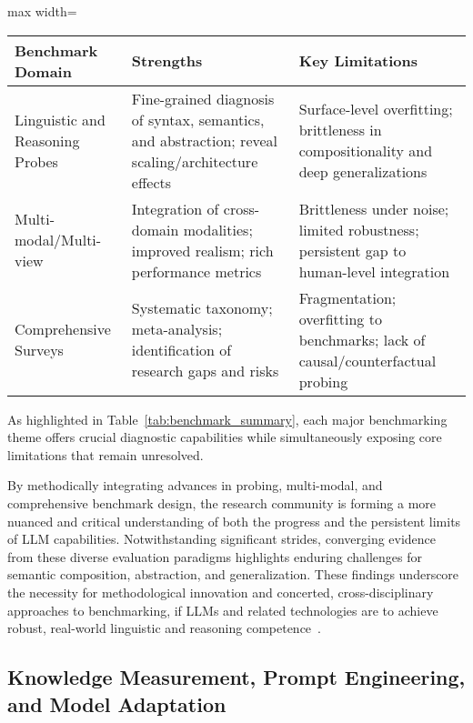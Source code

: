 \begin{table*}[htbp]
  \centering
  \caption{Comparison of Major Benchmark Themes and Identified Limitations}
  \label{tab:benchmark_summary}
  \begin{adjustbox}{max width=\textwidth}
  \begin{tabular}{lll}
    \toprule
    \textbf{Benchmark Domain} & \textbf{Strengths} & \textbf{Key Limitations} \\
    \midrule
    Linguistic and Reasoning Probes & Fine-grained diagnosis of syntax, semantics, and abstraction; reveal scaling/architecture effects & Surface-level overfitting; brittleness in compositionality and deep generalizations \\
    Multi-modal/Multi-view & Integration of cross-domain modalities; improved realism; rich performance metrics & Brittleness under noise; limited robustness; persistent gap to human-level integration \\
    Comprehensive Surveys & Systematic taxonomy; meta-analysis; identification of research gaps and risks & Fragmentation; overfitting to benchmarks; lack of causal/counterfactual probing \\
    \bottomrule
  \end{tabular}
  \end{adjustbox}
\end{table*}

As highlighted in Table~\ref{tab:benchmark_summary}, each major benchmarking theme offers crucial diagnostic capabilities while simultaneously exposing core limitations that remain unresolved.

By methodically integrating advances in probing, multi-modal, and comprehensive benchmark design, the research community is forming a more nuanced and critical understanding of both the progress and the persistent limits of LLM capabilities. Notwithstanding significant strides, converging evidence from these diverse evaluation paradigms highlights enduring challenges for semantic composition, abstraction, and generalization. These findings underscore the necessity for methodological innovation and concerted, cross-disciplinary approaches to benchmarking, if LLMs and related technologies are to achieve robust, real-world linguistic and reasoning competence~\cite{ref92, ref94, ref96, ref97, ref98, ref99}.

\subsection{Knowledge Measurement, Prompt Engineering, and Model Adaptation}

